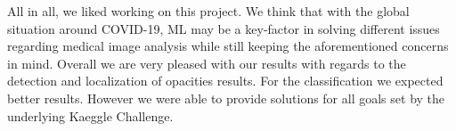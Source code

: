All in all, we liked working on this project. We think that with the global situation around COVID-19, ML may be a key-factor in solving different issues regarding medical image analysis while still keeping the aforementioned concerns in mind. Overall we are very pleased with our results with regards to the detection and localization of opacities results. For the classification we expected better results. However we were able to provide solutions for all goals set by the underlying Kaeggle Challenge.
